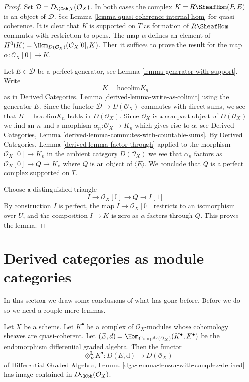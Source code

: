 \begin{proof}
Set $\mathcal{D} = D_{\QCoh, T}(\mathcal{O}_X)$. In both cases the complex
$K = R\SheafHom(P, E)$ is an object of $\mathcal{D}$. See
Lemma \ref{lemma-quasi-coherence-internal-hom} for quasi-coherence.
It is clear that $K$ is supported on $T$ as formation of $R\SheafHom$
commutes with restriction to opens.
The map $\alpha$ defines an element of
$H^0(K) = \Hom_{D(\mathcal{O}_X)}(\mathcal{O}_X[0], K)$.
Then it suffices to prove the result for the map
$\alpha : \mathcal{O}_X[0] \to K$.

\medskip\noindent
Let $E \in \mathcal{D}$ be a perfect generator, see
Lemma \ref{lemma-generator-with-support}. Write
$$
K = \text{hocolim} K_n
$$
as in Derived Categories, Lemma \ref{derived-lemma-write-as-colimit}
using the generator $E$. Since the functor $\mathcal{D} \to D(\mathcal{O}_X)$
commutes with direct sums, we see that $K = \text{hocolim} K_n$
holds in $D(\mathcal{O}_X)$. Since $\mathcal{O}_X$ is a compact
object of $D(\mathcal{O}_X)$ we find an $n$ and a morphism
$\alpha_n : \mathcal{O}_X \to K_n$ which gives rise to $\alpha$, see
Derived Categories, Lemma \ref{derived-lemma-commutes-with-countable-sums}.
By Derived Categories, Lemma \ref{derived-lemma-factor-through}
applied to the morphism $\mathcal{O}_X[0] \to K_n$ in the ambient
category $D(\mathcal{O}_X)$ we see that $\alpha_n$ factors as
$\mathcal{O}_X[0] \to Q \to K_n$ where $Q$ is an object
of $\langle E \rangle$. We conclude that $Q$ is a perfect complex
supported on $T$.

\medskip\noindent
Choose a distinguished triangle
$$
I \to \mathcal{O}_X[0] \to Q \to I[1]
$$
By construction $I$ is perfect, the map $I \to \mathcal{O}_X[0]$
restricts to an isomorphism over $U$, and the composition
$I \to K$ is zero as $\alpha$ factors through $Q$.
This proves the lemma.
\end{proof}






\section{Derived categories as module categories}
\label{section-derived-is-dga}

\noindent
In this section we draw some conclusions of what has gone before.
Before we do so we need a couple more lemmas.

\begin{lemma}
\label{lemma-tensor-with-QCoh-complex}
Let $X$ be a scheme. Let $K^\bullet$ be a complex of $\mathcal{O}_X$-modules
whose cohomology sheaves are quasi-coherent. Let
$(E, d) = \Hom_{\text{Comp}^{dg}(\mathcal{O}_X)}(K^\bullet, K^\bullet)$
be the endomorphism differential graded algebra. Then the functor
$$
- \otimes_E^\mathbf{L} K^\bullet :
D(E, \text{d}) \longrightarrow D(\mathcal{O}_X)
$$
of
Differential Graded Algebra, Lemma
\ref{dga-lemma-tensor-with-complex-derived}
has image contained in $D_\QCoh(\mathcal{O}_X)$.
\end{lemma}

